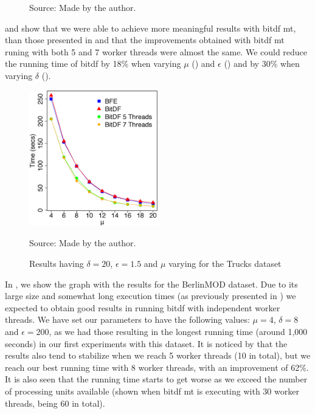 {\begin{figure}[h!]
\begin{subfigure}[t]{0.49\textwidth}
        \label{fig:trucks_complete_vary_g}
    \end{subfigure}
    \footnotesize{Source: Made by the author.}
    \label{fig:trucks_complete_results}
\end{figure}

 and  show that we were able to achieve more
meaningful results with \ac{bitdf} \ac{mt}, than those presented in  and that the improvements
obtained with \ac{bitdf} \ac{mt} runing with both 5 and 7 worker threads were almost the same. We could reduce the
running time of \ac{bitdf} by 18\% when varying $\mu$ () and $\epsilon$
() and by 30\% when varying $\delta$ ().

\begin{figure}[h!]
    \centering
    \caption{Results having $\delta = 20$, $\epsilon = 1.5$ and $\mu$ varying for the Trucks dataset}
    \centerline{\includegraphics[width=0.5\textwidth]{images/Trucks_complete_varying_n.eps}}
    \footnotesize{Source: Made by the author.}
    \label{fig:trucks_complete_vary_n}
\end{figure}

In , we show the graph with the results for the BerlinMOD dataset. Due to its large size
and somewhat long execution times (as previously presented in ) we expected to obtain good results
in running \ac{bitdf} with independent worker threads. We have set our parameters to have the following values: $\mu=4$,
$\delta=8$ and $\epsilon=200$, as we had those resulting in the longest running time (around 1,000 seconds) in our first
experiments with this dataset. It is noticed by  that the results also tend to stabilize
when we reach 5 worker threads (10 in total), but we reach our best running time with 8 worker threads, with an
improvement of 62\%. It is also seen that the running time starts to get worse as we exceed the number of processing
units available (shown when \ac{bitdf} \ac{mt} is executing with 30 worker threads, being 60 in total).

}
